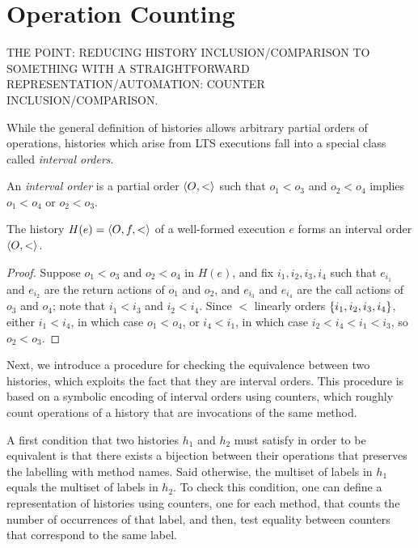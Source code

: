\section{Operation Counting}

THE POINT: REDUCING HISTORY INCLUSION/COMPARISON TO SOMETHING WITH A
STRAIGHTFORWARD REPRESENTATION/AUTOMATION: COUNTER INCLUSION/COMPARISON.

While the general definition of histories allows arbitrary partial orders of
operations, histories which arise from LTS executions fall into a special class
called \emph{interval orders}.

\begin{definition}

  An \emph{interval order} is a partial order $\left\langle {O,<} \right\rangle$ such that
  $o_1 < o_3$ and $o_2 < o_4$ implies $o_1 < o_4$ or $o_2 < o_3$.

\end{definition}

\begin{lemma}
  \label{lem:intervals}

  The history $H(e) = \left\langle {O,f,<} \right\rangle$ of a well-formed execution $e$ forms an
  interval order $\left\langle {O,<} \right\rangle$.

\end{lemma}

\begin{proof}

  Suppose $o_1 < o_3$ and $o_2 < o_4$ in $H(e)$, and fix $i_1, i_2, i_3, i_4$
  such that $e_{i_1}$ and $e_{i_2}$ are the return actions of $o_1$ and $o_2$,
  and $e_{i_3}$ and $e_{i_4}$ are the call actions of $o_3$ and $o_4$; note
  that $i_1 < i_3$ and $i_2 < i_4$. Since $<$ linearly orders ${\{ i_1, i_2,
  i_3, i_4 \}}$, either $i_1 < i_4$, in which case $o_1 < o_4$, or $i_4 < i_1$, in
  which case $i_2 < i_4 < i_1 < i_3$, so $o_2 < o_3$.

\end{proof}

Next, we introduce a procedure for checking the equivalence between two
histories, which exploits the fact that they are interval orders. This
procedure is based on a symbolic encoding of interval orders using counters,
which roughly count operations of a history that are invocations of the same
method.

A first condition that two histories $h_1$ and $h_2$ must satisfy in order to
be equivalent is that there exists a bijection between their operations that
preserves the labelling with method names. Said otherwise, the multiset of
labels in $h_1$ equals the multiset of labels in $h_2$. To check this
condition, one can define a representation of histories using counters, one for
each method, that counts the number of occurrences of that label, and then,
test equality between counters that correspond to the same label.

